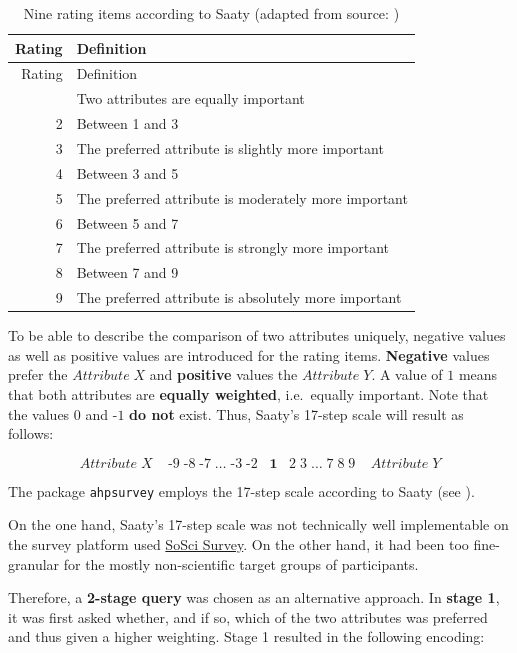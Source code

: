 \documentclass [oneside,10pt,a4paper,ngerman,BCOR10mm,headsepline,parindent,final]{scrartcl}
\begin{document}
\begin{longtable}[]{@{}rl@{}}
\caption{Nine rating items according to Saaty (adapted from source:
\cite{Vignettes_ahpsurvey_2019})}\tabularnewline
\toprule\noalign{}
Rating & Definition \\
\midrule\noalign{}
\endfirsthead
\toprule\noalign{}
Rating & Definition \\
\midrule\noalign{}
\endhead
\bottomrule\noalign{}
\endlastfoot
1 & Two attributes are equally important \\
2 & Between 1 and 3 \\
3 & The preferred attribute is slightly more important \\
4 & Between 3 and 5 \\
5 & The preferred attribute is moderately more important \\
6 & Between 5 and 7 \\
7 & The preferred attribute is strongly more important \\
8 & Between 7 and 9 \\
9 & The preferred attribute is absolutely more important \\
\end{longtable}

To be able to describe the comparison of two attributes uniquely,
negative values as well as positive values are introduced for the rating
items. \textbf{Negative} values prefer the \(Attribute\;X\) and
\textbf{positive} values the \(Attribute\;Y\). A value of \textbf{\(1\)}
means that both attributes are \textbf{equally weighted}, i.e.~equally
important. Note that the values \(0\) and \(\text{-}1\) \textbf{do not}
exist. Thus, Saaty's 17-step scale will result as follows:

\[Attribute\;X\;\;\;\;\text{-}9\;\text{-}8\;\text{-}7\;\ldots\;\text{-}3\;\text{-}2\;\;\;\textbf{1}\;\;\;2\;3\;\ldots\;7\;8\;9\;\;\;\;Attribute\;Y\]

The package \texttt{ahpsurvey} employs the 17-step scale according to
Saaty (see \cite{Vignettes_ahpsurvey_2019}).

On the one hand, Saaty's 17-step scale was not technically well
implementable on the survey platform used
\href{https://www.soscisurvey.de/}{SoSci Survey}. On the other hand, it
had been too fine-granular for the mostly non-scientific target groups
of participants.

Therefore, a \textbf{2-stage query} was chosen as an alternative
approach. In \textbf{stage 1}, it was first asked whether, and if so,
which of the two attributes was preferred and thus given a higher
weighting. Stage 1 resulted in the following encoding:
\end{document}
